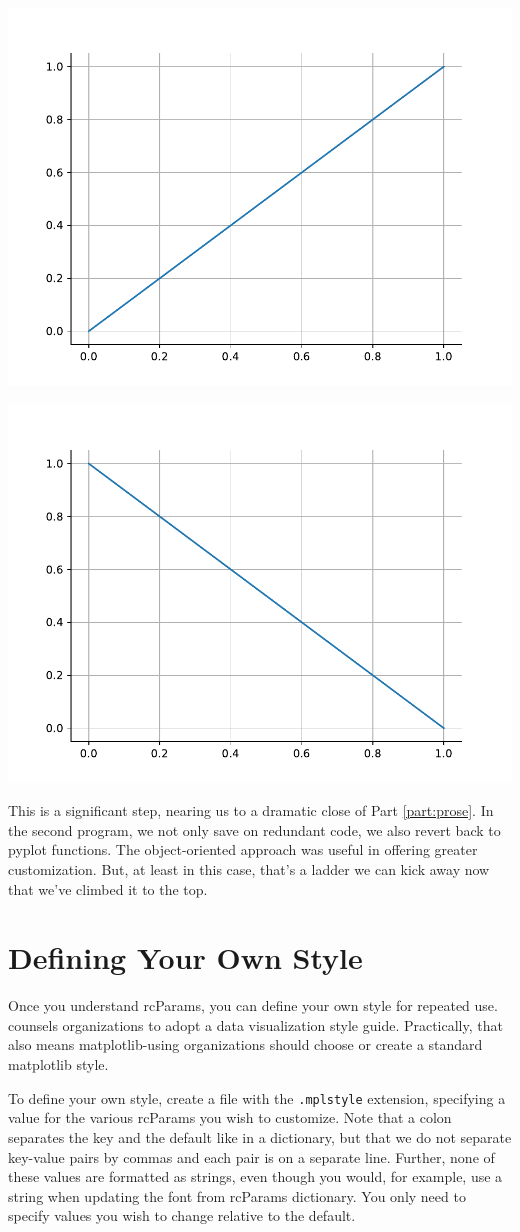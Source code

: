 \vspace{-0.5cm}
\begin{center}
    \includegraphics[width = .48\textwidth]{figures/proseplots/style1.pdf}
    
    \includegraphics[width = .48\textwidth]{figures/proseplots/style2.pdf}
\end{center}


This is a significant step, nearing us to a dramatic close of Part \ref{part:prose}. In the second program, we not only save on redundant code, we also revert back to pyplot functions. The object-oriented approach was useful in offering greater customization. But, at least in this case, that's a ladder we can kick away now that we've climbed it to the top.  

\section{Defining Your Own Style}

Once you understand rcParams, you can define your own style for repeated use. \cite{schwabish2021better} counsels organizations to adopt a data visualization style guide. Practically, that also means matplotlib-using organizations should choose or create a standard matplotlib style. 

To define your own style, create a file with the \texttt{.mplstyle} extension, specifying a value for the various rcParams you wish to customize. Note that a colon separates the key and the default like in a dictionary, but that we do not separate key-value pairs by commas and each pair is on a separate line. Further, none of these values are formatted as strings, even though you would, for example, use a string  when updating the font from rcParams dictionary. You only need to specify values you wish to change relative to the default.


